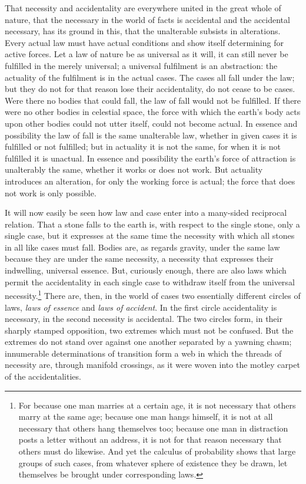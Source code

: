 \documentclass[12pt,a4paper]{book}
\begin{document}
That necessity and accidentality are everywhere united in the great whole of nature,
that the necessary in the world of facts is accidental and the accidental necessary, has
its
ground in this, that the unalterable subsists in alterations. Every actual law must have
actual conditions and show itself determining for active forces. Let a law of nature be
as universal as it will, it can still never be fulfilled in the merely universal; a
universal fulfilment is an abstraction: the actuality of the fulfilment is in the actual
cases. The cases all fall under the law; but they do not for that reason lose their
accidentality, do not cease to be cases. Were there no bodies that could fall, the law
of fall would not be fulfilled. If there were no other bodies in celestial space, the
force with which the earth's body acts upon other bodies could not utter itself, could
not become actual. In essence and possibility the law of fall is the same unalterable
law, whether in given cases it is fulfilled or not fulfilled; but in actuality it is not
the same, for when it is not fulfilled it is unactual. In essence and possibility the
earth's force of attraction is unalterably the same, whether it works or does not work.
But actuality introduces an alteration, for only the working force is actual; the force
that does not work is only possible.

It will now easily be seen how law and case enter into a many-sided reciprocal relation.
That a stone falls to the earth is, with respect to the single stone, only a single
case, but it expresses at the same time the necessity with which all stones in all like
cases must fall. Bodies are, as regards gravity, under the same law because they are
under the same necessity, a necessity that expresses their indwelling, universal
essence. But, curiously enough, there are also laws which permit the accidentality in
each single case to withdraw itself from the
universal necessity.\footnote{For because one man marries at a certain age, it is not
necessary that others marry at the same age; because one man hangs himself, it is not at
all necessary that others hang themselves too; because one man in distraction posts a
letter without an address, it is not for that reason necessary that others must do
likewise. And yet the calculus of probability shows that large groups of such cases,
from whatever sphere of existence they be drawn, let themselves be brought under
corresponding laws.}
There are, then, in the world of cases two essentially different circles of laws,
\emph{laws of essence} and \emph{laws of accident}. In the first circle accidentality is
necessary, in the second necessity is accidental. The two circles form, in their sharply
stamped opposition, two extremes which must not be confused. But the extremes do not
stand over against one another separated by a yawning chasm; innumerable determinations
of transition form a web in which the threads of necessity are, through manifold
crossings, as it were woven into the motley carpet of the accidentalities.
\end{document}

